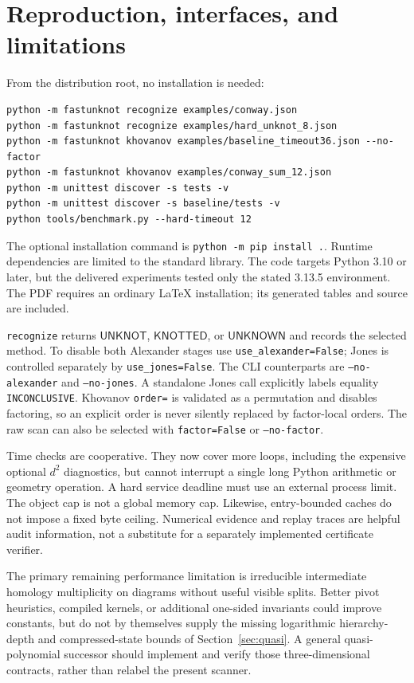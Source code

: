\documentclass[11pt]{article}
\theoremstyle{definition}\newtheorem{definition}[theorem]{Definition}
\theoremstyle{remark}\newtheorem{remark}[theorem]{Remark}
\newcommand{\unk}{\textsf{UNKNOT}}
\newcommand{\knot}{\textsf{KNOTTED}}
\newcommand{\unknown}{\textsf{UNKNOWN}}
\begin{document}
\section{Reproduction, interfaces, and limitations}
From the distribution root, no installation is needed:
\begin{lstlisting}
python -m fastunknot recognize examples/conway.json
python -m fastunknot recognize examples/hard_unknot_8.json
python -m fastunknot khovanov examples/baseline_timeout36.json --no-factor
python -m fastunknot khovanov examples/conway_sum_12.json
python -m unittest discover -s tests -v
python -m unittest discover -s baseline/tests -v
python tools/benchmark.py --hard-timeout 12
\end{lstlisting}
The optional installation command is \texttt{python -m pip install .}. Runtime
dependencies are limited to the standard library. The code targets Python 3.10
or later, but the delivered experiments tested only the stated 3.13.5
environment. The PDF requires an ordinary LaTeX installation; its generated
tables and source are included.

\texttt{recognize} returns $\unk$, $\knot$, or $\unknown$ and records the
selected method. To disable both Alexander stages use
\texttt{use\_alexander=False}; Jones is controlled separately by
\texttt{use\_jones=False}. The CLI counterparts are \texttt{--no-alexander}
and \texttt{--no-jones}. A standalone Jones call explicitly labels equality
\texttt{INCONCLUSIVE}. Khovanov \texttt{order=} is validated as a permutation
and disables factoring, so an explicit order is never silently replaced by
factor-local orders. The raw scan can also be selected with
\texttt{factor=False} or \texttt{--no-factor}.

Time checks are cooperative. They now cover more loops, including the expensive
optional $d^2$ diagnostics, but cannot interrupt a single long Python arithmetic
or geometry operation. A hard service deadline must use an external process
limit. The object cap is not a global memory cap. Likewise, entry-bounded caches
do not impose a fixed byte ceiling. Numerical evidence and replay traces are
helpful audit information, not a substitute for a separately implemented
certificate verifier.

The primary remaining performance limitation is irreducible intermediate
homology multiplicity on diagrams without useful visible splits. Better
pivot heuristics, compiled kernels, or additional one-sided invariants could
improve constants, but do not by themselves supply the missing logarithmic
hierarchy-depth and compressed-state bounds of Section~\ref{sec:quasi}.
A general quasi-polynomial successor should implement and verify those
three-dimensional contracts, rather than relabel the present scanner.
\end{document}
